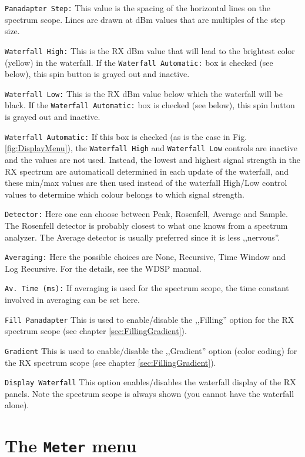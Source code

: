 \documentclass[12pt]{book}
\def\rett#1{\texttt{\color{red}#1}}
\begin{document}
\rett{Panadapter Step:} This value is the spacing of the horizontal lines on
the spectrum scope. Lines are drawn at dBm values that are multiples of the step
size.

\rett{Waterfall High:} This is the RX dBm value that will lead to the brightest
color (yellow) in the waterfall. If the \rett{Waterfall Automatic:} box is checked
(see below), this spin button is grayed out and inactive.

\rett{Waterfall Low:} This is the RX dBm value below which the waterfall will be black.
If the \rett{Waterfall Automatic:} box is checked
(see below), this spin button is grayed out and inactive.

\rett{Waterfall Automatic:} If this box is checked (as is the case in
Fig. \ref{fig:DisplayMenu}), the \rett{Waterfall High} and
\rett{Waterfall Low} controls are inactive and the values are not used. Instead,
the lowest and highest signal strength in the RX spectrum are automaticall determined
in each update of the waterfall, and these min/max values
 are then used instead of the waterfall High/Low control values to determine which
 colour belongs to which signal strength.

\rett{Detector:} Here one can choose between Peak, Rosenfell, Average and Sample. The
Rosenfell detector is probably closest to what one knows from a spectrum analyzer.
The Average detector is usually preferred since it is less ,,nervous''.

\rett{Averaging:} Here the possible choices are None, Recursive, Time Window and
Log Recursive. For the details, see the WDSP manual.

\rett{Av. Time (ms):} If averaging is used for the spectrum scope, the time
constant involved in averaging can be set here.

\rett{Fill Panadapter} This is used to enable/disable the ,,Filling'' option
for the RX  spectrum scope (see chapter \ref{sec:FillingGradient}).

\rett{Gradient} This is used to enable/disable the ,,Gradient'' option
(color coding) for the RX spectrum scope (see chapter \ref{sec:FillingGradient}).

 \rett{Display Waterfall} This option enables/disables the waterfall display
 of the RX panels. Note the spectrum scope is always shown (you cannot have the
 waterfall alone).


\section{The \texttt{Meter} menu}
\end{document}
